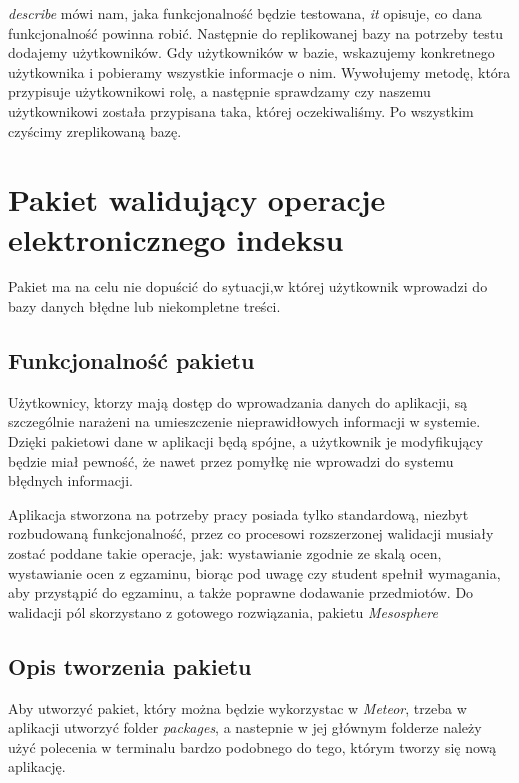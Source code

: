 \documentclass{xmgr}
\begin{document}
\textit{describe} mówi nam, jaka funkcjonalność będzie testowana, \textit{it} opisuje, co dana funkcjonalność powinna robić. Następnie do replikowanej bazy na potrzeby testu dodajemy użytkowników. Gdy użytkowników w bazie, wskazujemy konkretnego użytkownika i pobieramy wszystkie informacje o nim. Wywołujemy metodę, która przypisuje użytkownikowi rolę, a następnie sprawdzamy czy naszemu użytkownikowi została przypisana taka, której oczekiwaliśmy. Po wszystkim czyścimy zreplikowaną bazę. \cite{Velocity}

\chapter{Pakiet walidujący operacje elektronicznego indeksu}
\indent \indent \indent Pakiet ma na celu nie dopuścić do sytuacji,w której użytkownik wprowadzi do bazy danych błędne lub niekompletne treści.
\section{Funkcjonalność pakietu}

\indent \indent \indent Użytkownicy, ktorzy mają dostęp do wprowadzania danych do aplikacji, są szczególnie narażeni na umieszczenie nieprawidłowych informacji w systemie. Dzięki pakietowi dane w aplikacji będą spójne, a użytkownik je modyfikujący będzie miał pewność, że nawet przez pomyłkę nie wprowadzi do systemu błędnych informacji.

\indent Aplikacja stworzona na potrzeby pracy posiada tylko standardową, niezbyt rozbudowaną funkcjonalność, przez co procesowi rozszerzonej walidacji musiały zostać poddane takie operacje, jak: wystawianie zgodnie ze skalą ocen, wystawianie ocen z egzaminu, biorąc pod uwagę czy student spełnił wymagania, aby przystąpić do egzaminu, a także poprawne dodawanie przedmiotów. Do walidacji pól skorzystano z gotowego rozwiązania, pakietu \textit{Mesosphere}
\section{Opis tworzenia pakietu}

\indent \indent \indent Aby utworzyć pakiet, który można będzie wykorzystac w \textit{Meteor}, trzeba w aplikacji utworzyć folder \textit{packages}, a nastepnie w jej  głównym folderze należy użyć polecenia w terminalu bardzo podobnego do tego, którym tworzy się nową aplikację.
\end{document}
